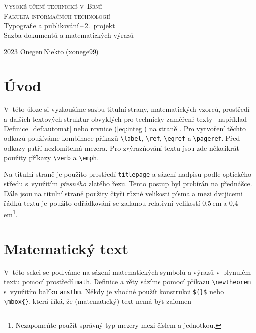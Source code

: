 \documentclass[a4paper, twocolumn, 11pt]{article}
\theoremstyle{plain}
\begin{document}
\begin{titlepage}
	\begin{center}
		{\Huge \textsc{Vysoké učení technické v~Brně}\\[0.5em]}
		{\huge \textsc{Fakulta informačních technologií}}\\
		{\LARGE Typografie a publikování\,--\,2.\ projekt\\[0.4em]
			Sazba dokumentů a matematických výrazů}\\
	\end{center}
	{\Large 2023 \hfill Onegen\,Niekto (xonege99)}
\end{titlepage}

\section*{Úvod}

V~této úloze si vyzkoušíme sazbu titulní strany, mate\-matických vzorců,
prostředí a dalších textových struktur obvyklých pro technicky zaměřené texty\,--\,například
Defi\-nice~\ref{def:automat} nebo rovnice (\ref{eq:integ}) na straně \pageref{def:automat}.
Pro vytvoření těchto odkazů používáme kombinace příkazů
\verb|\label|, \verb|\ref|, \verb|\eqref| a \verb|\pageref|. Před odkazy patří nezlomitelná mezera.
Pro zvýrazňování textu jsou zde několikrát použity příkazy \verb|\verb| a \verb|\emph|.

Na titulní straně je použito prostředí \texttt{titlepage} a sázení nadpisu podle
optického středu s~využitím \emph{přesného} zlatého řezu. Tento postup byl probírán na přednášce.
Dále jsou na titulní straně použity čtyři různé velikosti písma a mezi dvojicemi řádků textu
je použito odřádkování se zadanou relativní velikostí 0,5\,em a
0,4\,em\footnote{Nezapomeňte použít správný typ mezery mezi číslem a jednotkou.}.

\section{Matematický text}

V~této sekci se podíváme na sázení matematických symbolů a výrazů v~plynulém textu pomocí prostředí
\texttt{math}. Definice a věty sázíme pomocí příkazu \verb|\newtheorem| s~využitím balíku
\texttt{amsthm}. Někdy je vhodné použít konstrukci \verb|${}$| nebo \verb|\mbox{}|,
která říká, že (matematický) text nemá být zalomen.
\end{document}
